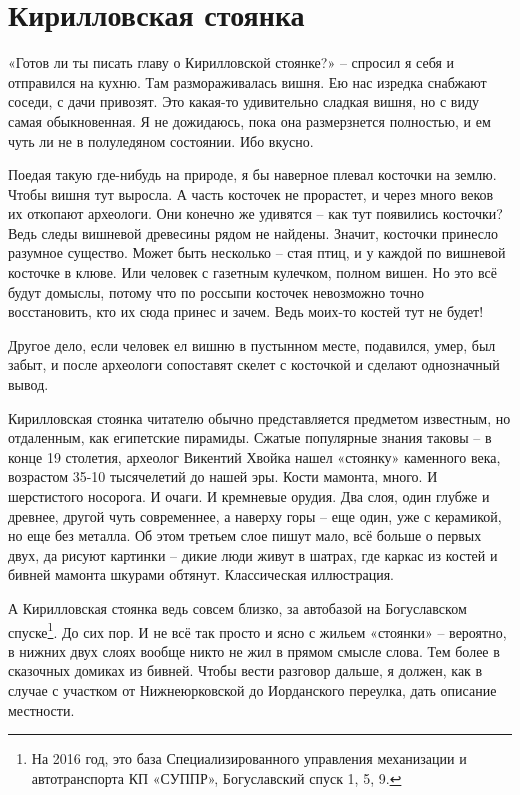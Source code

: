 \chapter{Кирилловская стоянка}

«Готов ли ты писать главу о Кирилловской стоянке?» – спросил я себя и отправился на кухню. Там размораживалась вишня. Ею нас изредка снабжают соседи, с дачи привозят. Это какая-то удивительно сладкая вишня, но с виду самая обыкновенная. Я не дожидаюсь, пока она размерзнется полностью, и ем чуть ли не в полуледяном состоянии. Ибо вкусно.
   
Поедая такую где-нибудь на природе, я бы наверное плевал косточки на землю. Чтобы вишня тут выросла. А часть косточек не прорастет, и через много веков их откопают археологи. Они конечно же удивятся – как тут появились косточки? Ведь следы вишневой древесины рядом не найдены. Значит, косточки принесло разумное существо. Может быть несколько – стая птиц, и у каждой по вишневой косточке в клюве. Или человек с газетным кулечком, полном вишен. Но это всё будут домыслы, потому что по россыпи косточек невозможно точно восстановить, кто их сюда принес и зачем. Ведь моих-то костей тут не будет!

Другое дело, если человек ел вишню в пустынном месте, подавился, умер, был забыт, и после археологи сопоставят скелет с косточкой и сделают однозначный вывод.

Кирилловская стоянка читателю обычно представляется предметом известным, но отдаленным, как египетские пирамиды. Сжатые популярные знания таковы – в конце 19 столетия, археолог Викентий Хвойка нашел «стоянку» каменного века, возрастом 35-10 тысячелетий до нашей эры. Кости мамонта, много. И шерстистого носорога. И очаги. И кремневые орудия. Два слоя, один глубже и древнее, другой чуть современнее, а наверху горы – еще один, уже с керамикой, но еще без металла. Об этом третьем слое пишут мало, всё больше о первых двух, да рисуют картинки – дикие люди живут в шатрах, где каркас из костей и бивней мамонта шкурами обтянут. Классическая иллюстрация.

А Кирилловская стоянка ведь совсем близко, за автобазой на Богуславском спуске\footnote{На 2016 год, это база Специализированного управления механизации и автотранспорта КП «СУППР», Богуславский спуск 1, 5, 9.}. До сих пор. И не всё так просто и ясно с жильем «стоянки» – вероятно, в нижних двух слоях вообще никто не жил в прямом смысле слова. Тем более в сказочных домиках из бивней. Чтобы вести разговор дальше, я должен, как в случае с участком от Нижнеюрковской до Иорданского переулка, дать описание местности.

